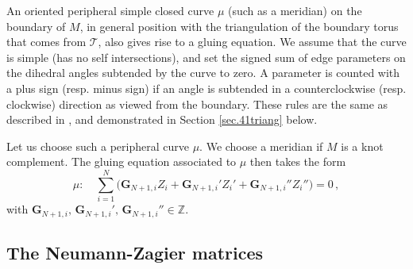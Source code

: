 \documentclass[12pt]{amsart}
\newcommand{\lbl}{\label}
\theoremstyle{definition}
\def\be{  \begin{equation} }
\def\ee{  \end{equation} }
\newcommand{\CT}{\mathcal{T}}
\newcommand{\Z}{\mathbb{Z}}
\newcommand{\cf}{\emph{cf.}}
\newcommand{\mb}{\mathbf}
\numberwithin{equation}{section}
\begin{document}
An oriented peripheral simple closed curve $\mu$ (such as a meridian) on the 
boundary of $M$, 
in general position with the triangulation of the boundary torus that
comes from $\CT$, also gives rise to a gluing equation. We assume that the curve is simple (has no self intersections), and set the signed sum of edge parameters on the dihedral angles subtended by the curve to zero. A parameter is counted with a plus sign (resp. minus sign) if an angle is subtended in a counterclockwise (resp. clockwise) direction as viewed from the boundary. These rules are the same as described in \cite{Neumann-combi}, and demonstrated in Section \ref{sec.41triang} below.


Let us choose such a peripheral curve $\mu$. We choose a meridian if $M$ is a knot complement. The gluing equation associated to $\mu$ then takes the form
%
\be \mu:\quad  \sum_{i=1}^N \big( \mb{G}_{N+1,i} Z_i+\mb{G}_{N+1,i}' Z_i'
+\mb{G}_{N+1,i}''Z_i'' \big) = 0\,,  \lbl{merid} \ee
%
with $\mb{G}_{N+1,i},\,\mb{G}_{N+1,i}',\,\mb{G}_{N+1,i}''\in \Z$. 


\subsection{The Neumann-Zagier matrices}
\lbl{sec.NZ}
\end{document}
